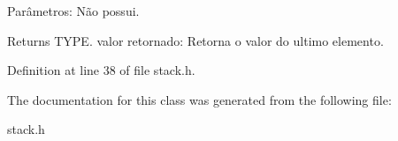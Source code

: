 Parâmetros\+: Não possui.

\begin{DoxyReturn}{Returns}
T\+Y\+P\+E. valor retornado\+: Retorna o valor do ultimo elemento. 
\end{DoxyReturn}


Definition at line 38 of file stack.\+h.



The documentation for this class was generated from the following file\+:\begin{DoxyCompactItemize}
\item 
stack.\+h\end{DoxyCompactItemize}
